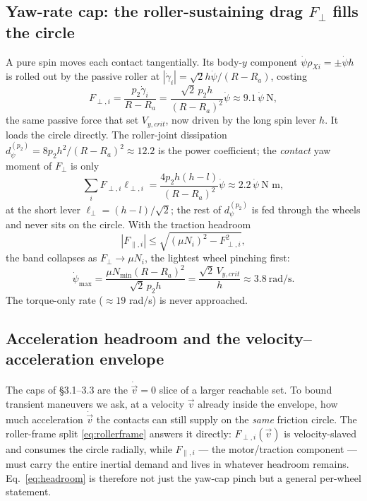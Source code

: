 \documentclass[11pt]{article}
\begin{document}
\subsection{Yaw-rate cap: the roller-sustaining drag $F_\perp$ fills the circle}
A pure spin moves each contact tangentially. Its body-$y$ component $\dot\psi\rho_{Xi}=\pm\dot\psi h$
is rolled out by the passive roller at $|\dot\gamma_i|=\sqrt2 h\dot\psi/(R-R_a)$, costing
\begin{equation}
F_{\perp,i}=\frac{p_2\dot\gamma_i}{R-R_a}=\frac{\sqrt2\,p_2h}{(R-R_a)^2}\dot\psi\approx9.1\,\dot\psi\ \text{N},
\end{equation}
the same passive force that set $V_{y,crit}$, now driven by the long spin lever $h$. It loads the
circle directly. The roller-joint dissipation $d_\psi^{(p_2)}=8p_2h^2/(R-R_a)^2\approx12.2$ is the
power coefficient; the \emph{contact} yaw moment of $F_\perp$ is only
\begin{equation}
\sum_iF_{\perp,i}\ell_{\perp,i}=\frac{4p_2h(h-l)}{(R-R_a)^2}\dot\psi\approx2.2\,\dot\psi\ \text{N m},
\label{eq:yawmoment}
\end{equation}
at the short lever $\ell_\perp=(h-l)/\sqrt2$; the rest of $d_\psi^{(p_2)}$ is fed through the wheels
and never sits on the circle. With the traction headroom
\begin{equation}
|F_{\parallel,i}|\le\sqrt{(\mu N_i)^2-F_{\perp,i}^2},
\label{eq:headroom}
\end{equation}
the band collapses as $F_\perp\to\mu N_i$, the lightest wheel pinching first:
\begin{equation}
\dot\psi_{\max}=\frac{\mu N_{\min}(R-R_a)^2}{\sqrt2\,p_2h}=\frac{\sqrt2\,V_{y,crit}}{h}\approx3.8\ \text{rad/s}.
\end{equation}
The torque-only rate ($\approx19$ rad/s) is never approached.

\subsection{Acceleration headroom and the velocity--acceleration envelope}
The caps of \S3.1--3.3 are the $\dot{\vec v}=0$ slice of a larger reachable set. To bound transient
maneuvers we ask, at a velocity $\vec v$ already inside the envelope, how much acceleration
$\dot{\vec v}$ the contacts can still supply on the \emph{same} friction circle. The roller-frame
split \eqref{eq:rollerframe} answers it directly: $F_{\perp,i}(\vec v)$ is velocity-slaved and
consumes the circle radially, while $F_{\parallel,i}$ --- the motor/traction component --- must
carry the entire inertial demand and lives in whatever headroom remains. Eq.~\eqref{eq:headroom}
is therefore not just the yaw-cap pinch but a general per-wheel statement.
\end{document}
